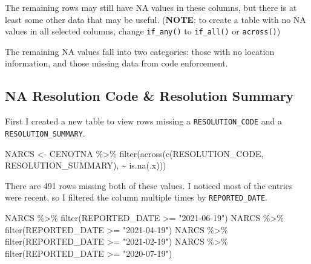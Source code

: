 \documentclass[
]{book}
\newenvironment{Shaded}{\begin{snugshade}}{\end{snugshade}}
\newcommand{\FunctionTok}[1]{\textcolor[rgb]{0.00,0.00,0.00}{#1}}
\newcommand{\NormalTok}[1]{#1}
\newcommand{\OtherTok}[1]{\textcolor[rgb]{0.56,0.35,0.01}{#1}}
\newcommand{\SpecialCharTok}[1]{\textcolor[rgb]{0.00,0.00,0.00}{#1}}
\newcommand{\StringTok}[1]{\textcolor[rgb]{0.31,0.60,0.02}{#1}}
\begin{document}
The remaining rows may still have NA values in these columns, but there is at least some other data that may be useful. (\textbf{NOTE}: to create a table with no NA values in all selected columns, change \texttt{if\_any()} to \texttt{if\_all()} or \texttt{across()})

The remaining NA values fall into two categories: those with no location information, and those missing data from code enforcement.

\hypertarget{na-resolution-code-resolution-summary}{%
\subsection{NA Resolution Code \& Resolution Summary}\label{na-resolution-code-resolution-summary}}

First I created a new table to view rows missing a \texttt{RESOLUTION\_CODE} and a \texttt{RESOLUTION\_SUMMARY}.

\begin{Shaded}
\begin{Highlighting}[]
\NormalTok{NARCS }\OtherTok{\textless{}{-}}\NormalTok{ CENOTNA }\SpecialCharTok{\%\textgreater{}\%} \FunctionTok{filter}\NormalTok{(}\FunctionTok{across}\NormalTok{(}\FunctionTok{c}\NormalTok{(RESOLUTION\_CODE, RESOLUTION\_SUMMARY), }\SpecialCharTok{\textasciitilde{}} \FunctionTok{is.na}\NormalTok{(.x)))}
\end{Highlighting}
\end{Shaded}

There are 491 rows missing both of these values. I noticed most of the entries were recent, so I filtered the column multiple times by \texttt{REPORTED\_DATE}.

\begin{Shaded}
\begin{Highlighting}[]
\NormalTok{NARCS }\SpecialCharTok{\%\textgreater{}\%} \FunctionTok{filter}\NormalTok{(REPORTED\_DATE }\SpecialCharTok{\textgreater{}=} \StringTok{"2021{-}06{-}19"}\NormalTok{)}
\NormalTok{NARCS }\SpecialCharTok{\%\textgreater{}\%} \FunctionTok{filter}\NormalTok{(REPORTED\_DATE }\SpecialCharTok{\textgreater{}=} \StringTok{"2021{-}04{-}19"}\NormalTok{)}
\NormalTok{NARCS }\SpecialCharTok{\%\textgreater{}\%} \FunctionTok{filter}\NormalTok{(REPORTED\_DATE }\SpecialCharTok{\textgreater{}=} \StringTok{"2021{-}02{-}19"}\NormalTok{)}
\NormalTok{NARCS }\SpecialCharTok{\%\textgreater{}\%} \FunctionTok{filter}\NormalTok{(REPORTED\_DATE }\SpecialCharTok{\textgreater{}=} \StringTok{"2020{-}07{-}19"}\NormalTok{)}
\end{Highlighting}
\end{Shaded}
\end{document}
